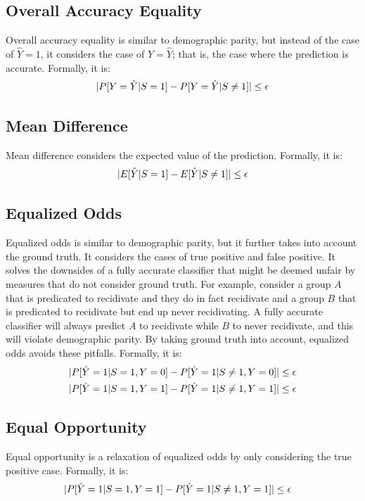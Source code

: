\documentclass[conference]{IEEEtran}
\begin{document}
\subsection{Overall Accuracy Equality}
Overall accuracy equality \cite{berk2021fairness} is similar to demographic parity, but instead of the case of $\hat{Y} = 1$, it considers the case of $Y = \hat{Y}$; that is, the case where the prediction is accurate. Formally, it is:
\[
    \lvert P[Y = \hat{Y} | S = 1] - P[Y = \hat{Y} | S \neq 1]\rvert \leq \epsilon
\]

\subsection{Mean Difference}
Mean difference \cite{vzliobaite2017measuring} considers the expected value of the prediction. Formally, it is:
\[
    \lvert E[\hat{Y}|S = 1] - E[\hat{Y}|S \neq 1]\rvert \leq \epsilon
\]

\subsection{Equalized Odds}
Equalized odds \cite{hardt2016equality} is similar to demographic parity, but it further takes into account the ground truth. It considers the cases of true positive and false positive. It solves the downsides of a fully accurate classifier that might be deemed unfair by measures that do not consider ground truth. For example, consider a group $A$ that is predicated to recidivate and they do in fact recidivate and a group $B$ that is predicated to recidivate but end up never recidivating. A fully accurate classifier will always predict $A$ to recidivate while $B$ to never recidivate, and this will violate demographic parity. By taking ground truth into account, equalized odds avoids these pitfalls. Formally, it is:
\begin{align*}
    \lvert P[\hat{Y} = 1 | S = 1, Y = 0] - P[\hat{Y} = 1 | S \neq 1, Y = 0]\rvert & \leq \epsilon \\
    \lvert P[\hat{Y} = 1 | S = 1, Y = 1] - P[\hat{Y} = 1 | S \neq 1, Y = 1]\rvert & \leq \epsilon
\end{align*}

\subsection{Equal Opportunity}
Equal opportunity \cite{hardt2016equality} is a relaxation of equalized odds by only considering the true positive case. Formally, it is:
\begin{align*}
    \lvert P[\hat{Y} = 1 | S = 1, Y = 1] - P[\hat{Y} = 1 | S \neq 1, Y = 1]\rvert & \leq \epsilon
\end{align*}
\end{document}
